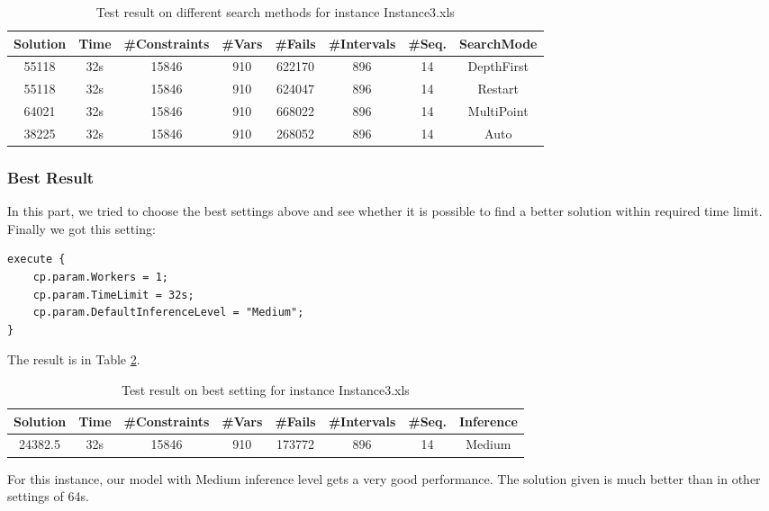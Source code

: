 \documentclass[a4paper, 12pt]{article}
\begin{document}
\begin{table}
    \centering
    \caption{Test result on different search methods for instance Instance3.xls}
    \label{diffSear3}
    \begin{tabular}{|c|c|c|c|c|c|c|c|}
        \hline
        Solution & Time & \#Constraints & \#Vars & \#Fails & \#Intervals & \#Seq. & SearchMode \\
        \hline
        55118 & 32s & 15846 & 910 & 622170 & 896 & 14 & DepthFirst \\
        \hline 
        55118 & 32s & 15846 & 910 & 624047 & 896 & 14 & Restart \\
        \hline
        64021 & 32s & 15846 & 910 & 668022 & 896 & 14 & MultiPoint \\
        \hline
        38225 & 32s & 15846 & 910 & 268052 & 896 & 14 & Auto \\
        \hline
    \end{tabular}
\end{table}

\subsubsection{Best Result}

In this part, we tried to choose the best settings above and see whether it is possible to find a better solution within required time limit. Finally we got this setting: 

\begin{lstlisting}
execute {
    cp.param.Workers = 1;
    cp.param.TimeLimit = 32s; 
    cp.param.DefaultInferenceLevel = "Medium";
}
\end{lstlisting}

The result is in Table \ref{best3}. 

\begin{table}
    \centering
    \caption{Test result on best setting for instance Instance3.xls}
    \label{best3}
    \begin{tabular}{|c|c|c|c|c|c|c|c|}
        \hline
        Solution & Time & \#Constraints & \#Vars & \#Fails & \#Intervals & \#Seq. & Inference \\
        \hline
        24382.5 & 32s & 15846 & 910 & 173772 & 896 & 14 & Medium \\
        \hline
    \end{tabular}
\end{table}

For this instance, our model with Medium inference level gets a very good performance. The solution given is much better than in other settings of 64s. 
\end{document}

